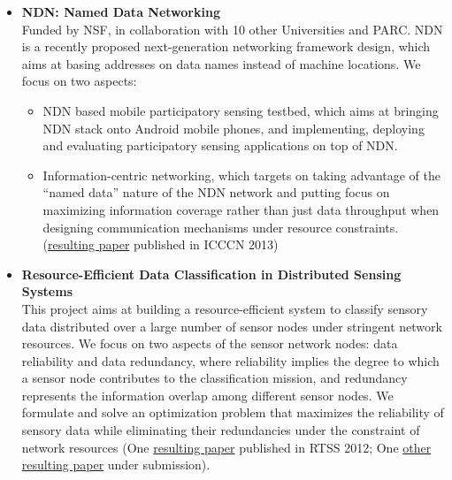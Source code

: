 \begin{itemize}
	\item \textbf{NDN: Named Data Networking} \\
	Funded by NSF, in collaboration with 10 other Universities and PARC. NDN is a recently proposed next-generation networking framework design, which aims at basing addresses on data names instead of machine locations. We focus on two aspects: 
	\begin{itemize}
		\item NDN based mobile participatory sensing testbed, which aims at bringing NDN stack onto Android mobile phones, and implementing, deploying and evaluating participatory sensing applications on top of NDN. 
		\item Information-centric networking, which targets on taking advantage of the ``named data'' nature of the NDN network and putting focus on maximizing information coverage rather than just data throughput when designing communication mechanisms under resource constraints. (\hyperlink{wang2013icccn}{resulting paper} published in \textsc{ICCCN 2013}) 
	\end{itemize}
	
	\item \textbf{Resource-Efficient Data Classification in Distributed Sensing Systems} \\
	This project aims at building a resource-efficient system to classify sensory data distributed over a large number of sensor nodes under stringent network resources. We focus on two aspects of the sensor network nodes: data reliability and data redundancy, where reliability implies the degree to which a sensor node contributes to the classification mission, and redundancy represents the information overlap among different sensor nodes. We formulate and solve an optimization problem that maximizes the reliability of sensory data while eliminating their redundancies under the constraint of network resources (One \hyperlink{su2013rtss}{resulting paper} published in \textsc{RTSS 2012}; One \hyperlink{su2014ipsn}{other resulting paper} under submission). 
\end{itemize}

